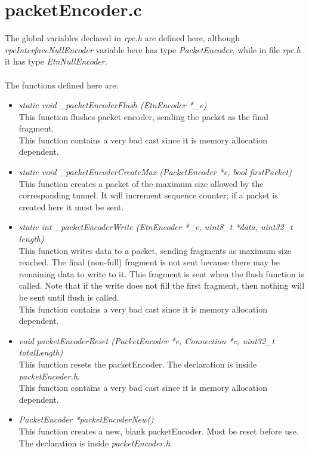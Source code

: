 \section{packetEncoder.c}
The global variables declared in \emph{rpc.h} are defined here, although \emph{rpcInterfaceNullEncoder} variable here has type \emph{PacketEncoder}, while in file \emph{rpc.h} it has type \emph{EtnNullEncoder}.\\\\
The functions defined here are:
\begin{itemize}

\item \emph{static void \_packetEncoderFlush (EtnEncoder *\_e)}\\
This function flushes packet encoder, sending the packet as the final fragment.\\
This function contains a very bad cast since it is memory allocation dependent.
\item \emph{static void \_packetEncoderCreateMax (PacketEncoder *e, bool firstPacket)}\\
This function creates a packet of the maximum size allowed by the corresponding tunnel. It will increment sequence counter; if a packet is created here it must be sent.
\item \emph{static int \_packetEncoderWrite (EtnEncoder *\_e, uint8\_t *data, uint32\_t length)}\\
This function writes data to a packet, sending fragments as maximum size reached. The final (non-full) fragment is not sent because there may be remaining data to write to it. This fragment is sent when the flush function is called. Note that if the write does not fill the first fragment, then nothing will be sent until flush is called.\\
This function contains a very bad cast since it is memory allocation dependent.
\item \emph{void packetEncoderReset (PacketEncoder *e, Connection *c, uint32\_t totalLength)}\\
This function resets the packetEncoder. The declaration is inside \emph{packetEncoder.h}.\\
This function contains a very bad cast since it is memory allocation dependent.
\item \emph{PacketEncoder *packetEncoderNew()}\\
This function creates a new, blank packetEncoder. Must be reset before use. The declaration is inside \emph{packetEncoder.h}.

\end{itemize}

